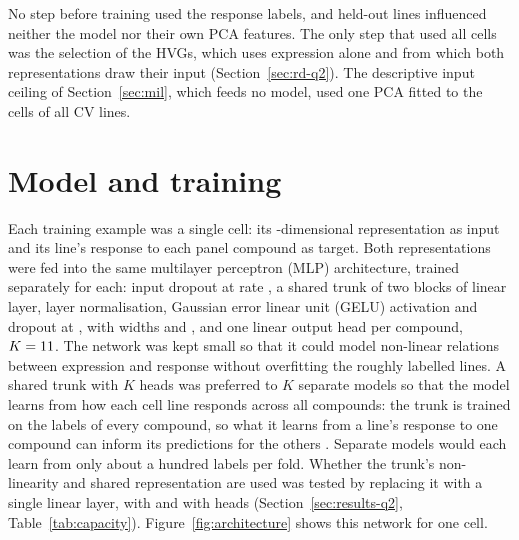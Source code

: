 No step before training used the response labels, and held-out lines influenced neither the model nor
their own PCA features. The only step that used all cells was the selection of the HVGs, which uses
expression alone and from which both representations draw their input (Section~\ref{sec:rd-q2}). The
descriptive input ceiling of Section~\ref{sec:mil}, which feeds no model, used one PCA fitted to the cells
of all \NLinesCV{} CV lines.

\section{Model and training}
\label{sec:model}

Each training example was a single cell: its \NPca-dimensional representation as input and its line's
response to each panel compound as target. Both representations were fed into the same multilayer perceptron (MLP) architecture, trained
separately for each: input dropout at rate \CfgInDrop{},
a shared trunk of two blocks of linear layer, layer normalisation,
Gaussian error linear unit (GELU) activation and dropout at \CfgDrop{}, with widths \CfgHidA{} and
\CfgHidB{}, and one linear output head per compound, $K = 11$. The network was kept small so that it could
model non-linear relations between expression and response without overfitting the roughly \NLinesCV{}
labelled lines.
A shared trunk with $K$ heads was preferred to $K$ separate models so that the model learns from how each
cell line responds across all compounds: the trunk is trained on the labels of every compound, so what it
learns from a line's response to one compound can inform its predictions for the others
\cite{partin2023}. Separate models would each learn from only about a hundred labels per fold. Whether the trunk's
non-linearity and shared representation are used was tested by replacing it with a single linear layer,
with \NPanel{} and with \NDrugsModelled{} heads (Section~\ref{sec:results-q2}, Table~\ref{tab:capacity}).
Figure~\ref{fig:architecture} shows this network for one cell.

